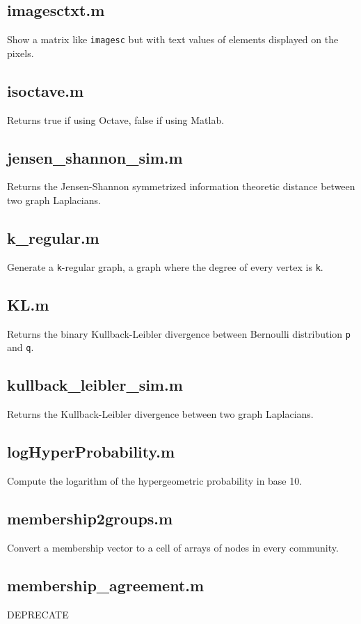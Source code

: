 \documentclass[a4paper]{report}
\begin{document}
  \subsection*{imagesctxt.m} Show a matrix like \texttt{imagesc} but with
  text values of elements displayed on the pixels.

  \subsection*{isoctave.m} Returns true if using Octave, false if using
  Matlab.

  \subsection*{jensen\_shannon\_sim.m} Returns the Jensen-Shannon symmetrized
  information theoretic distance between two graph Laplacians.

  \subsection*{k\_regular.m} Generate a \texttt{k}-regular graph, a graph
  where the degree of every vertex is \texttt{k}.

  \subsection*{KL.m} Returns the binary Kullback-Leibler divergence between
  Bernoulli distribution \texttt{p} and \texttt{q}.

  \subsection*{kullback\_leibler\_sim.m} Returns the Kullback-Leibler
  divergence between two graph Laplacians.

  \subsection*{logHyperProbability.m} Compute the logarithm of the
  hypergeometric probability in base 10.

  \subsection*{membership2groups.m} Convert a membership vector to a cell of
  arrays of nodes in every community.

  \subsection*{membership\_agreement.m} DEPRECATE
\end{document}

